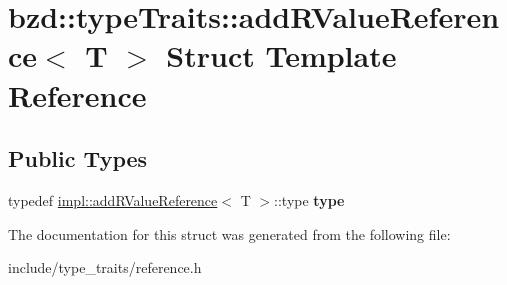 \hypertarget{structbzd_1_1typeTraits_1_1addRValueReference}{}\section{bzd\+:\+:type\+Traits\+:\+:add\+R\+Value\+Reference$<$ T $>$ Struct Template Reference}
\label{structbzd_1_1typeTraits_1_1addRValueReference}
\subsection*{Public Types}
\begin{DoxyCompactItemize}
\item 
\mbox{\label{structbzd_1_1typeTraits_1_1addRValueReference_a6d0b7c905fc6adcf99fee5f3e7aceead}} 
typedef \hyperlink{structbzd_1_1typeTraits_1_1impl_1_1addRValueReference}{impl\+::add\+R\+Value\+Reference}$<$ T $>$\+::type {\bfseries type}
\end{DoxyCompactItemize}


The documentation for this struct was generated from the following file\+:\begin{DoxyCompactItemize}
\item 
include/type\+\_\+traits/reference.\+h\end{DoxyCompactItemize}
